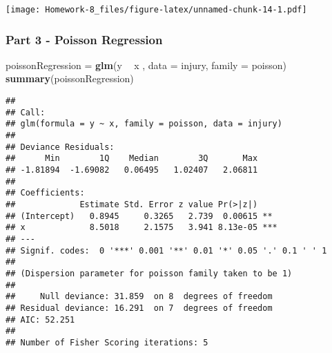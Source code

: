 \documentclass[]{article}
\newenvironment{Shaded}{\begin{snugshade}}{\end{snugshade}}
\newcommand{\DataTypeTok}[1]{\textcolor[rgb]{0.13,0.29,0.53}{#1}}
\newcommand{\DecValTok}[1]{\textcolor[rgb]{0.00,0.00,0.81}{#1}}
\newcommand{\KeywordTok}[1]{\textcolor[rgb]{0.13,0.29,0.53}{\textbf{#1}}}
\newcommand{\NormalTok}[1]{#1}
\newcommand{\OperatorTok}[1]{\textcolor[rgb]{0.81,0.36,0.00}{\textbf{#1}}}
\newcommand{\StringTok}[1]{\textcolor[rgb]{0.31,0.60,0.02}{#1}}
\begin{document}
\begin{Shaded}
\end{Shaded}

\texttt{[image: Homework-8\_files/figure-latex/unnamed-chunk-14-1.pdf]}

\hypertarget{part-3---poisson-regression}{%
\subsubsection{Part 3 - Poisson
Regression}\label{part-3---poisson-regression}}

\begin{Shaded}
\begin{Highlighting}[]
\NormalTok{poissonRegression =}\StringTok{ }\KeywordTok{glm}\NormalTok{(y }\OperatorTok{~}\StringTok{ }\NormalTok{x  , }\DataTypeTok{data =}\NormalTok{ injury, }\DataTypeTok{family =}\NormalTok{ poisson)}
\KeywordTok{summary}\NormalTok{(poissonRegression)}
\end{Highlighting}
\end{Shaded}

\begin{verbatim}
## 
## Call:
## glm(formula = y ~ x, family = poisson, data = injury)
## 
## Deviance Residuals: 
##      Min        1Q    Median        3Q       Max  
## -1.81894  -1.69082   0.06495   1.02407   2.06811  
## 
## Coefficients:
##             Estimate Std. Error z value Pr(>|z|)    
## (Intercept)   0.8945     0.3265   2.739  0.00615 ** 
## x             8.5018     2.1575   3.941 8.13e-05 ***
## ---
## Signif. codes:  0 '***' 0.001 '**' 0.01 '*' 0.05 '.' 0.1 ' ' 1
## 
## (Dispersion parameter for poisson family taken to be 1)
## 
##     Null deviance: 31.859  on 8  degrees of freedom
## Residual deviance: 16.291  on 7  degrees of freedom
## AIC: 52.251
## 
## Number of Fisher Scoring iterations: 5
\end{verbatim}

\begin{Shaded}
\end{Shaded}
\end{document}

